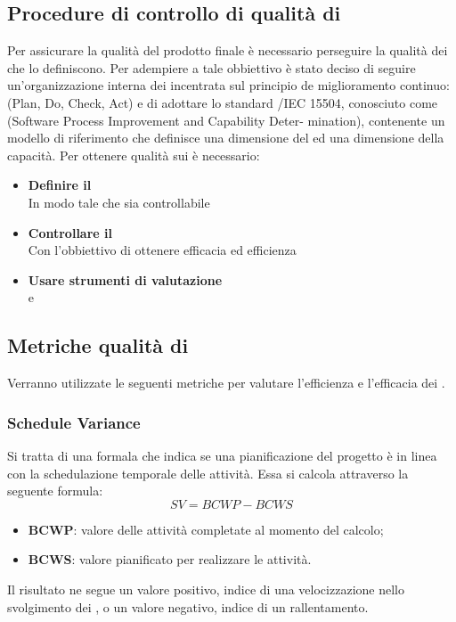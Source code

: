 \subsection{Procedure di controllo di qualità di }
Per assicurare la qualità del prodotto finale è necessario perseguire la qualità dei  che lo definiscono. Per adempiere a tale obbiettivo è stato deciso di seguire un'organizzazione interna dei  incentrata sul principio de miglioramento continuo:  (Plan, Do, Check, Act) e di adottare lo standard /IEC 15504, conosciuto come  (Software Process Improvement and Capability Deter- mination), contenente un modello di riferimento che definisce una dimensione del  ed una dimensione della capacità.
Per ottenere qualità sui  è necessario:
\begin{itemize}
	\item \textbf{Definire il }\\ In modo tale che sia controllabile
	\item \textbf{Controllare il }\\ Con l'obbiettivo di ottenere efficacia ed efficienza  
	\item \textbf{Usare strumenti di valutazione}\\  e 
\end{itemize}
\subsection{Metriche qualità di }
Verranno utilizzate le seguenti metriche per valutare l’efficienza e l’efficacia dei .
\subsubsection{Schedule Variance}
Si tratta di una formala che indica se una pianificazione del progetto è in linea con la schedulazione temporale delle attività. Essa si calcola attraverso la seguente formula:
\begin{displaymath}
	SV = BCWP - BCWS
\end{displaymath}
\begin{itemize}
	\item \textbf{BCWP}: valore delle attività completate al momento del calcolo;
	\item \textbf{BCWS}: valore pianificato per realizzare le attività.
\end{itemize}
Il risultato ne segue un valore positivo, indice di una velocizzazione nello svolgimento dei , o un valore negativo, indice di un rallentamento.
